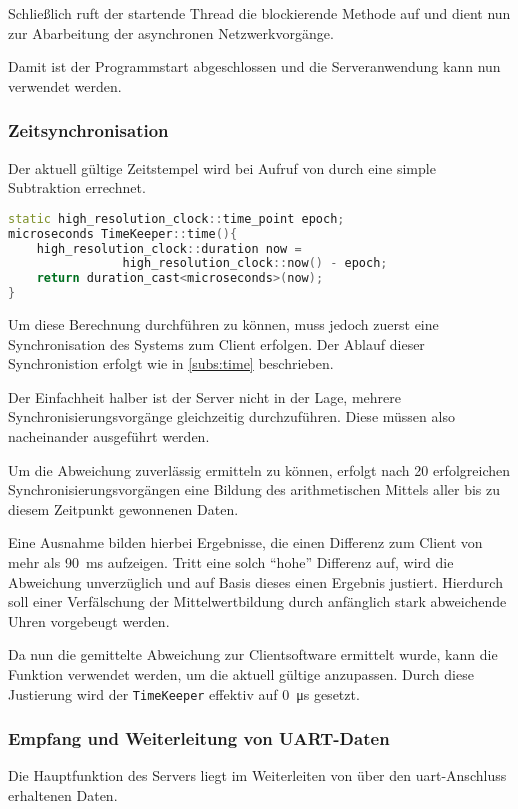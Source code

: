 Schließlich ruft der startende Thread die blockierende Methode
 auf und dient nun zur Abarbeitung der
asynchronen Netzwerkvorgänge.

Damit ist der Programmstart abgeschlossen und die Serveranwendung kann nun
verwendet werden.
\subsubsection*{Zeitsynchronisation}\label{subs:servertime}
Der aktuell gültige Zeitstempel wird bei Aufruf von
 durch eine simple Subtraktion errechnet.
\begin{lstlisting}[language=C++]
static high_resolution_clock::time_point epoch;
microseconds TimeKeeper::time(){
    high_resolution_clock::duration now = 
    			high_resolution_clock::now() - epoch;
    return duration_cast<microseconds>(now);
}
\end{lstlisting}
Um diese Berechnung durchführen zu können, muss jedoch zuerst eine
Synchronisation des Systems zum Client erfolgen. Der Ablauf dieser
Synchronistion erfolgt wie in \autoref{subs:time} beschrieben.

Der Einfachheit halber ist der Server nicht in der Lage, mehrere
Synchronisierungsvorgänge gleichzeitig durchzuführen. Diese müssen also
nacheinander ausgeführt werden.

Um die Abweichung zuverlässig ermitteln zu können, erfolgt nach 20
erfolgreichen Synchronisierungsvorgängen eine Bildung des arithmetischen Mittels
aller bis zu diesem Zeitpunkt gewonnenen Daten. 

Eine Ausnahme bilden hierbei Ergebnisse, die einen Differenz zum Client von mehr
als \SI{90}{\ms} aufzeigen. Tritt eine solch "`hohe"' Differenz auf, wird die
Abweichung unverzüglich und auf Basis dieses einen Ergebnis justiert. Hierdurch
soll einer Verfälschung der Mittelwertbildung durch anfänglich stark
abweichende Uhren vorgebeugt werden.

Da nun die gemittelte Abweichung zur Clientsoftware ermittelt wurde, kann die
Funktion \newline{} verwendet
werden, um die aktuell gültige  anzupassen. Durch diese
Justierung wird der \texttt{TimeKeeper} effektiv auf \SI{0}{\micro\second}
gesetzt.

\subsubsection*{Empfang und Weiterleitung von UART-Daten}
Die Hauptfunktion des Servers liegt im Weiterleiten von über den
\gls{uart}-Anschluss erhaltenen Daten.

